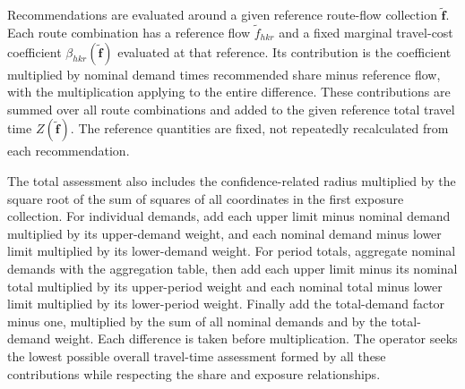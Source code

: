 \documentclass[10pt]{article}
\begin{document}
Recommendations are evaluated around a given reference route-flow collection $\tilde{\boldsymbol f}$. Each route combination has a reference flow $\tilde f_{hkr}$ and a fixed marginal travel-cost coefficient $\beta_{hkr}(\tilde{\boldsymbol f})$ evaluated at that reference. Its contribution is the coefficient multiplied by nominal demand times recommended share minus reference flow, with the multiplication applying to the entire difference. These contributions are summed over all route combinations and added to the given reference total travel time $Z(\tilde{\boldsymbol f})$. The reference quantities are fixed, not repeatedly recalculated from each recommendation.

The total assessment also includes the confidence-related radius multiplied by the square root of the sum of squares of all coordinates in the first exposure collection. For individual demands, add each upper limit minus nominal demand multiplied by its upper-demand weight, and each nominal demand minus lower limit multiplied by its lower-demand weight. For period totals, aggregate nominal demands with the aggregation table, then add each upper limit minus its nominal total multiplied by its upper-period weight and each nominal total minus lower limit multiplied by its lower-period weight. Finally add the total-demand factor minus one, multiplied by the sum of all nominal demands and by the total-demand weight. Each difference is taken before multiplication. The operator seeks the lowest possible overall travel-time assessment formed by all these contributions while respecting the share and exposure relationships.
\end{document}
